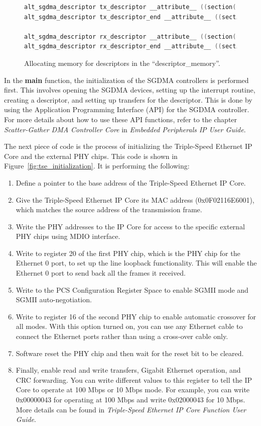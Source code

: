 \documentclass[11pt, twoside, pdftex]{article}
\begin{document}
\begin{figure}[H]
	\begin{lstlisting}[language=C]
alt_sgdma_descriptor tx_descriptor __attribute__ ((section(".descriptor_memory")));
alt_sgdma_descriptor tx_descriptor_end __attribute__ ((section(".descriptor_memory")));

alt_sgdma_descriptor rx_descriptor __attribute__ ((section(".descriptor_memory")));
alt_sgdma_descriptor rx_descriptor_end __attribute__ ((section(".descriptor_memory")));
	\end{lstlisting}
	\caption{Allocating memory for descriptors in the ``descriptor\_memory''.}
	\label{fig:attribute_keyword}
\end{figure}

In the {\bf main} function, the initialization of the SGDMA controllers is performed first. This involves opening the SGDMA devices, setting up the interrupt routine, creating a descriptor, and setting up transfers for the descriptor. This is done by using the Application Programming Interface (API) for the SGDMA controller. For more details about how to use these API functions, refer to the chapter {\it Scatter-Gather DMA Controller Core} in {\it Embedded Peripherals IP User Guide}.

The next piece of code is the process of initializing the Triple-Speed Ethernet IP Core and the external PHY chips. This code is shown in Figure~\ref{fig:tse_initialization}. It is performing the following:
\begin{enumerate}
	\item Define a pointer to the base address of the Triple-Speed Ethernet IP Core.
	\item Give the Triple-Speed Ethernet IP Core its MAC address (0x0F02116E6001), which matches the source address of the transmission frame. 
	\item Write the PHY addresses to the IP Core for access to the specific external PHY chips using MDIO interface. 
	\item Write to register 20 of the first PHY chip, which is the PHY chip for the Ethernet 0 port, to set up the line loopback functionality. This will enable the Ethernet 0 port to send back all the frames it received.
	\item Write to the PCS Configuration Register Space to enable SGMII mode and SGMII auto-negotiation. 
	\item Write to register 16 of the second PHY chip to enable automatic crossover for all modes. With this option turned on, you can use any Ethernet cable to connect the Ethernet ports rather than using a cross-over cable only.
	\item Software reset the PHY chip and then wait for the reset bit to be cleared. 
	\item Finally, enable read and write transfers, Gigabit Ethernet operation, and CRC forwarding. You can write different values to this register to tell the IP Core to operate at 100 Mbps or 10 Mbps mode. For example, you can write 0x00000043 for operating at 100 Mbps and write 0x02000043 for 10 Mbps. More details can be found in {\it Triple-Speed Ethernet IP Core Function User Guide}. 
\end{enumerate}
\end{document}
